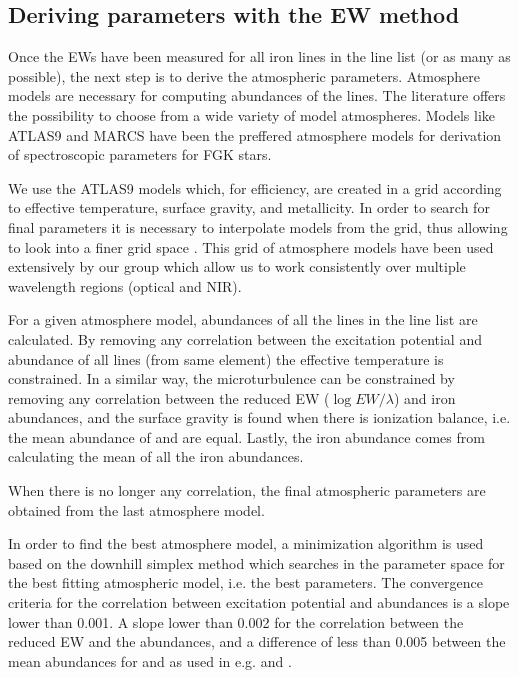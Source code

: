 \documentclass{aa}
\begin{document}
\subsection{Deriving parameters with the EW method}
\label{sec:deriving_parameters_with_the_ew_method}

Once the EWs have been measured for all iron lines in the line list
(or as many as possible), the next step is to derive the atmospheric
parameters. Atmosphere models are necessary for computing abundances of
the lines. The literature offers the possibility to choose from a wide
variety of model atmospheres. Models like ATLAS9 \citep{Kurucz1993} and
MARCS \citep{Gustafson2008} have been the preffered atmosphere models for
derivation of spectroscopic parameters for FGK stars.

We use the ATLAS9 models which, for efficiency, are created
in a grid according to effective temperature, surface gravity, and
metallicity. In order to search for final parameters it is necessary to
interpolate models from the grid, thus allowing to look into a finer
grid space \citep[see e.g.][]{Sousa2014}. This grid of atmosphere models
have been used extensively by our group which allow us to work
consistently over multiple wavelength regions (optical and NIR).

For a given atmosphere model, abundances of all the lines in the line
list are calculated. By removing any correlation between the excitation
potential and abundance of all lines (from same element) the effective
temperature is constrained. In a similar way, the microturbulence
can be constrained by removing any correlation between the reduced EW
($\log EW/\lambda$) and iron abundances, and the surface gravity is
found when there is ionization balance, i.e. the mean abundance of
 and  are equal. Lastly, the iron abundance comes
from calculating the mean of all the iron abundances.

When there is no longer any correlation, the final atmospheric
parameters are obtained from the last atmosphere model.

In order to find the best atmosphere model, a minimization algorithm
is used based on the downhill simplex method \citep{Press1992} which
searches in the parameter space for the best fitting atmospheric model,
i.e. the best parameters. The convergence criteria for the correlation
between excitation potential and abundances is a slope lower than
0.001. A slope lower than 0.002 for the correlation between the reduced
EW and the abundances, and a difference of less than 0.005 between
the mean abundances for  and  as used in e.g.
\cite{Sousa2008a} and \cite{Tsantaki2013}.
\end{document}
